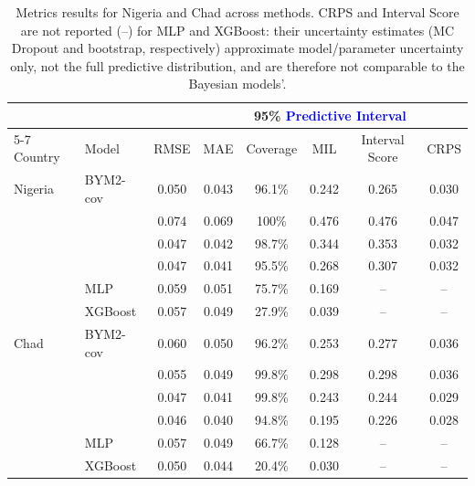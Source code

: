 \begin{table}[t!]
    \centering
    \caption{Metrics results for Nigeria and Chad across methods. CRPS and Interval Score are not reported (--) for MLP and XGBoost: their uncertainty estimates (MC Dropout and bootstrap, respectively) approximate model/parameter uncertainty only, not the full predictive distribution, and are therefore not comparable to the Bayesian models'.}
    \label{tab:prediction_metrics}
    \begin{tabular}{llcccccc}
    \toprule
    & & & & \multicolumn{3}{c}{95\% \textcolor{blue}{Predictive Interval}} & \\
    \cmidrule(lr){5-7}
    Country & Model & RMSE & MAE & Coverage & MIL & Interval Score & CRPS \\
    \midrule
    Nigeria & BYM2-cov & 0.050 & 0.043 & 96.1\% & 0.242 & 0.265 & 0.030 \\
     & \GPst{} & 0.074 & 0.069 & 100\% & 0.476 & 0.476 & 0.047 \\
     & \GPcov{} & 0.047 & 0.042 & 98.7\% & 0.344 & 0.353 & 0.032 \\
     & \GPcovoc{} & 0.047 & 0.041 & 95.5\% & 0.268 & 0.307 & 0.032 \\
     & MLP & 0.059 & 0.051 & 75.7\% & 0.169 & -- & -- \\
     & XGBoost & 0.057 & 0.049 & 27.9\% & 0.039 & -- & -- \\
    \midrule
    Chad & BYM2-cov & 0.060 & 0.050 & 96.2\% & 0.253 & 0.277 & 0.036 \\
     & \GPst{} & 0.055 & 0.049 & 99.8\% & 0.298 & 0.298 & 0.036 \\
     & \GPcov{} & 0.047 & 0.041 & 99.8\% & 0.243 & 0.244 & 0.029 \\
     & \GPcovoc{} & 0.046 & 0.040 & 94.8\% & 0.195 & 0.226 & 0.028 \\
     & MLP & 0.057 & 0.049 & 66.7\% & 0.128 & -- & -- \\
     & XGBoost & 0.050 & 0.044 & 20.4\% & 0.030 & -- & -- \\
    \bottomrule
    \end{tabular}
\end{table}

